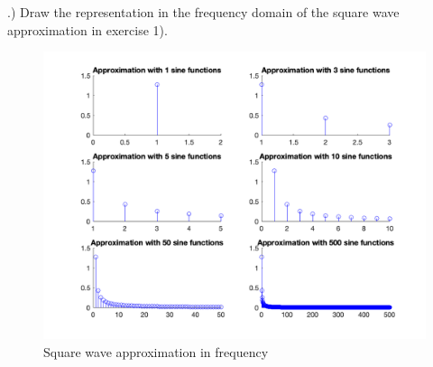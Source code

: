 \documentclass[12pt]{article}
\begin{document}
.) Draw the representation in the frequency domain of the square wave approximation in exercise 1). \\
\begin{figure}[!h] 
	\begin{centering}
		\includegraphics[keepaspectratio = true, width = 7in]{three.png}
		\caption{Square wave approximation in frequency}
	\end{centering}
\end{figure}\\

\end{document}

